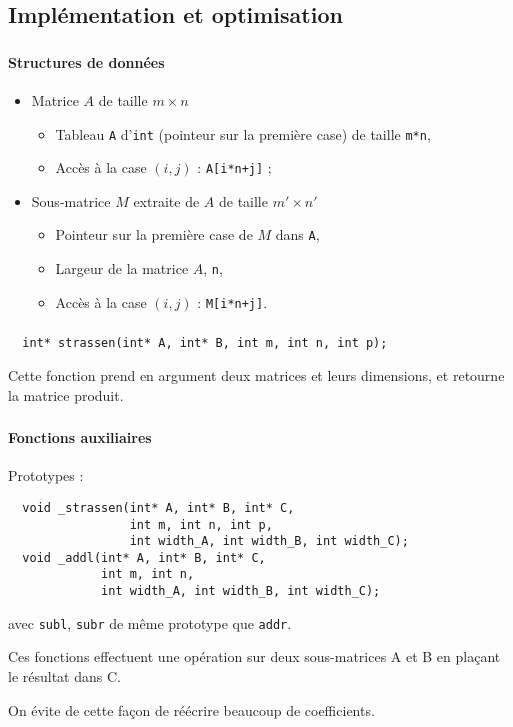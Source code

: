 \documentclass{beamer}
\begin{document}
\subsection{Implémentation et optimisation}
\begin{frame}[fragile]
  \frametitle{\insertsubsection}
  \framesubtitle{Structures de données}
  \begin{itemize}
    \item Matrice $A$ de taille $m\times n$
    \begin{itemize}
      \item Tableau \verb=A= d'\verb=int=
      (pointeur sur la première case) de taille \verb=m*n=,
      \item Accès à la case $(i,j)$ : \verb=A[i*n+j]= ;
    \end{itemize}
    \item<2-> Sous-matrice $M$ extraite de $A$ de taille $m'\times n'$
    \begin{itemize}
      \item Pointeur sur la première case de $M$ dans \verb=A=,
      \item Largeur de la matrice $A$, \verb=n=,
      \item Accès à la case $(i,j)$ : \verb=M[i*n+j]=.
    \end{itemize}
  \end{itemize}
\end{frame}

\begin{frame}[fragile]
  \frametitle{\insertsubsection}
  \small
  \begin{verbatim}
  int* strassen(int* A, int* B, int m, int n, int p);
  \end{verbatim}\normalsize
  Cette fonction prend en argument deux matrices et leurs dimensions,
  et retourne la matrice produit.
\end{frame}

\begin{frame}[fragile]
  \frametitle{\insertsubsection}
  \framesubtitle{Fonctions auxiliaires}
  Prototypes :
  \small\begin{verbatim}
  void _strassen(int* A, int* B, int* C,
                 int m, int n, int p,
                 int width_A, int width_B, int width_C);
  void _addl(int* A, int* B, int* C,
             int m, int n,
             int width_A, int width_B, int width_C);
  \end{verbatim}
  \normalsize
  avec \verb=subl=, \verb=subr= de même prototype que \verb=addr=.

  Ces fonctions effectuent une opération sur deux sous-matrices A et B
  en plaçant le résultat dans C.

  On évite de cette façon de réécrire beaucoup de coefficients.
\end{frame}
\end{document}
